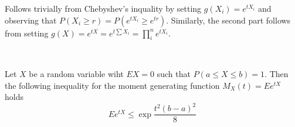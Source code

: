 \begin{prf} 
Follows trivially from Chebyshev's inquality by setting $g(X_i) = e^{tX_i}$ and observing that $P(X_i \geq r) = P(e^{tX_i} \geq e^{tr})$.
Similarly, the second part follows from setting $g(X) = e^{tX} = e^{t\sum X_i} = \prod^n_i e^{tX_i}$.
\end{prf}

\ \\

\begin{lemma}
Let $X$ be a random variable wiht $EX = 0$ such that $P(a \leq X \leq b) = 1$.
Then the following inequality for the moment generating function $M_X(t) = E e^{tX}$ holds
\begin{equation*}
E e^{tX} \leq \exp \frac{t^2(b-a)^2}{8}
\end{equation*}
\end{lemma}

